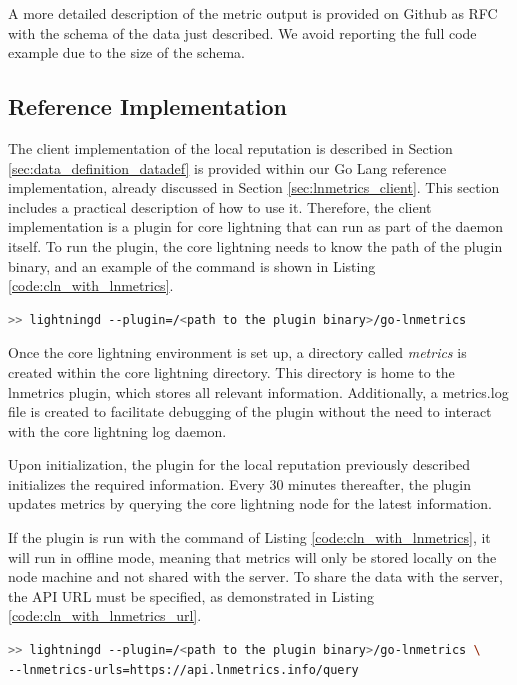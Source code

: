 A more detailed description of the metric output is provided on Github as RFC with 
the  schema of the data just described. We avoid reporting the full code example 
due to the size of the  schema.

\subsection{Reference Implementation}

The client implementation of the local reputation is described in Section \ref{sec:data_definition_datadef} 
is provided within our Go Lang reference implementation, already  discussed in Section \ref{sec:lnmetrics_client}. 
This section includes a practical description of how to use it. Therefore, the client implementation is 
a plugin for core lightning that can run as part of the daemon itself. To run the plugin, the core lightning 
needs to know the path of the plugin binary, and an example of the command is shown in
Listing \ref{code:cln_with_lnmetrics}.

\begin{lstlisting}[language=bash, basicstyle=\small,
                  caption={Command to run the core lightning daemon with the lnmetrics plugin enabled.}, 
                  label={code:cln_with_lnmetrics}]
>> lightningd --plugin=/<path to the plugin binary>/go-lnmetrics
\end{lstlisting}

Once the core lightning environment is set up, a directory called \emph{metrics} 
is created within the core lightning directory. This directory is home to the 
lnmetrics plugin, which stores all relevant information. Additionally, a metrics.log 
file is created to facilitate debugging of the plugin without the need to 
interact with the core lightning log daemon.

Upon initialization, the plugin for the local reputation previously described 
initializes the required information. Every 30 minutes thereafter, the plugin
updates metrics by querying the core lightning node for the latest information.

If the plugin is run with the command of Listing \ref{code:cln_with_lnmetrics}, it will run
in offline mode, meaning that metrics will only be stored locally on the node
machine and not shared with the server. To share the data with the server, the 
API URL must be specified, as demonstrated in Listing \ref{code:cln_with_lnmetrics_url}.

\begin{lstlisting}[language=bash, basicstyle=\small,
                  caption={Command to run core lightning with the lnmetrics plugin an publish the data.}, 
                  label={code:cln_with_lnmetrics_url}]
>> lightningd --plugin=/<path to the plugin binary>/go-lnmetrics \ 
--lnmetrics-urls=https://api.lnmetrics.info/query
\end{lstlisting}

